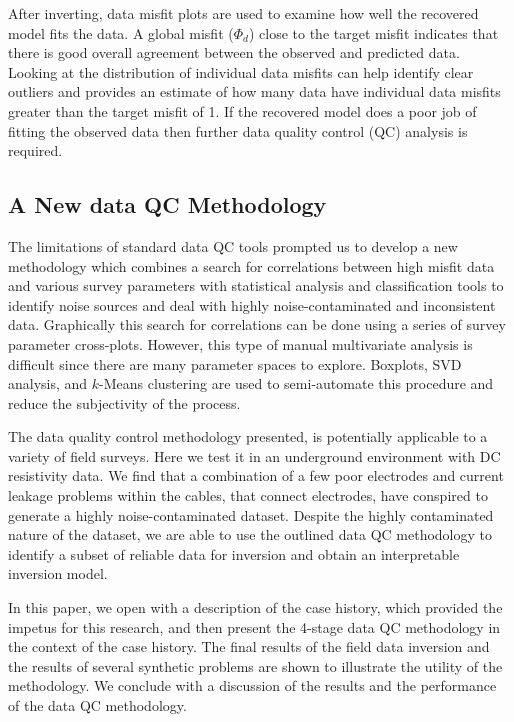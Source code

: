 \documentclass[final,authoryear,5p,times,twocolumn]{elsarticle}
\begin{document}
After inverting, data misfit plots are used to examine how well the recovered model fits the data. A global misfit ($\Phi_{d}$) close to the target misfit indicates that there is good overall agreement between the observed and predicted data. Looking at the distribution of individual data misfits can help identify clear outliers and provides an estimate of how many data have individual data misfits greater than the target misfit of 1. If the recovered model does a poor job of fitting the observed data then further data quality control (QC) analysis is required.

\subsection{A New data QC Methodology}

The limitations of standard data QC tools prompted us to develop a new methodology which combines a search for correlations between high misfit data and various survey parameters with statistical analysis and classification tools to identify noise sources and deal with highly noise-contaminated and inconsistent data. Graphically this search for correlations can be done using a series of survey parameter cross-plots. However, this type of manual multivariate analysis is difficult since there are many parameter spaces to explore. Boxplots, SVD analysis, and $k$-Means clustering \citep{MacQueen1967} are used to semi-automate this procedure and reduce the subjectivity of the process. 

The data quality control methodology presented, is potentially applicable to a variety of field surveys. Here we test it in an underground environment with DC resistivity data. We find that a combination of a few poor electrodes and current leakage problems within the cables, that connect electrodes, have conspired to generate a highly noise-contaminated dataset. Despite the highly contaminated nature of the dataset, we are able to use the outlined data QC methodology to identify a subset of reliable data for inversion and obtain an interpretable inversion model.  

In this paper, we open with a description of the case history, which provided the impetus for this research, and then present the 4-stage data QC methodology in the context of the case history. The final results of the field data inversion and the results of several synthetic problems are shown to illustrate the utility of the methodology. We conclude with a discussion of the results and the performance of the data QC methodology. 
 
\end{document}
